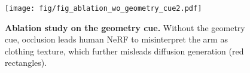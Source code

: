 
\begin{figure}[h]
    \centering
    \texttt{[image: fig/fig\_ablation\_wo\_geometry\_cue2.pdf]}
    \caption{\textbf{Ablation study on the geometry cue.} Without the geometry cue, occlusion leads human NeRF to misinterpret the arm as clothing texture, which further misleads diffusion generation (red rectangles).}
    \label{fig:ablation_wo_geo_cue}
\end{figure}
